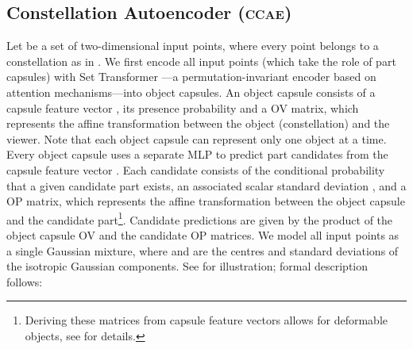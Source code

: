 \documentclass{article}
\begin{document}
\subsection{Constellation Autoencoder (\textsc{ccae})}
\label{sec:constellation}

Let  be a set of two-dimensional input points, where every point belongs to a constellation as in .
We first encode all input points (which take the role of part capsules) with Set Transformer \citep{Lee2019set}---a permutation-invariant encoder  based on attention mechanisms---into  object capsules.
An object capsule  consists of a capsule feature vector , its presence probability  and a  \gls{OV} matrix, which represents the affine transformation between the object (constellation) and the viewer.
Note that each object capsule can represent only one object at a time.
Every object capsule uses a separate \gls{MLP}  to predict  part candidates from the capsule feature vector .
Each candidate consists of the conditional probability  that a given candidate part exists, an associated scalar standard deviation , and a  \gls{OP} matrix, which represents the affine transformation between the object capsule and the candidate part\footnote{Deriving these matrices from capsule feature vectors allows for deformable objects, see  for details.}.
Candidate predictions  are given by the product of the object capsule \gls{OV} and the candidate \gls{OP} matrices.
We model all input points as a single Gaussian mixture, where  and  are the centres and standard deviations of the isotropic Gaussian components.
See  for illustration; formal description follows:
\end{document}
